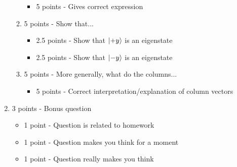 \documentclass[12pt]{article}
\begin{document}
\begin{enumerate}[font=\bfseries]
\begin{enumerate}
\begin{itemize}
                    \item 5 points - Gives correct expression
                \end{itemize}
            \item 5 points - Show that...
                \begin{itemize}
                    \item 2.5 points - Show that $\ket{+y}$ is an eigenstate
                    \item 2.5 points - Show that $\ket{-y}$ is an eigenstate
                \end{itemize}
            \item 5 points - More generally, what do the columns...
                \begin{itemize}
                    \item 5 points - Correct interpretation/explanation of column vectors
                \end{itemize}
        \end{enumerate}
        \item 3 points - Bonus question
        \begin{itemize}
            \item 1 point - Question is related to homework
            \item 1 point - Question makes you think for a moment
            \item 1 point - Question really makes you think
        \end{itemize}
\end{enumerate}
\end{document}
